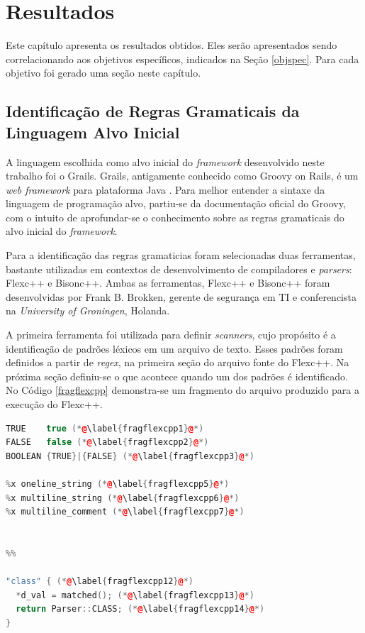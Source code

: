 \chapter[Resultados]{Resultados}
Este capítulo apresenta os resultados obtidos. Eles serão apresentados sendo
correlacionando aos objetivos específicos, indicados na Seção \ref{objspec}.
Para cada objetivo foi gerado uma seção neste capítulo.

\section{Identificação de Regras Gramaticais da Linguagem Alvo Inicial}
A linguagem escolhida como alvo inicial do \textit{framework} desenvolvido
neste trabalho foi o \textsf{Grails}. \textsf{Grails}, antigamente conhecido
como \textsf{Groovy on Rails}, é um \textit{web framework} para plataforma Java
\cite{grails2015}. Para melhor entender a sintaxe da linguagem de programação
alvo, partiu-se da documentação oficial do \textsf{Groovy}, com o intuito de
aprofundar-se o conhecimento sobre as regras gramaticais do alvo inicial do
\textit{framework}.

Para a identificação das regras gramaticias foram selecionadas duas ferramentas,
bastante utilizadas em contextos de desenvolvimento de compiladores e
\textit{parsers}: \textsf{Flexc++} e \textsf{Bisonc++}. Ambas as ferramentas, \textsf{Flexc++} e \textsf{Bisonc++} foram desenvolvidas por Frank B. Brokken, gerente de segurança em TI e conferencista na \textit{University of Groningen}, Holanda.

A primeira ferramenta foi utilizada para definir \textit{scanners}, cujo propósito é a identificação de padrões léxicos em um arquivo de texto. Esses padrões foram definidos a partir de \textit{regex}, na primeira seção do arquivo fonte do Flexc++. Na próxima seção definiu-se o que acontece quando um dos padrões é identificado. No Código \ref{fragflexcpp} demonstra-se um fragmento do arquivo produzido para a execução do \textsf{Flexc++}.

\begin{lstlisting}[language=C++, label=fragflexcpp, caption=Fragmento do código fonte para o \flexcpp]
TRUE    true (*@\label{fragflexcpp1}@*)
FALSE   false (*@\label{fragflexcpp2}@*)
BOOLEAN {TRUE}|{FALSE} (*@\label{fragflexcpp3}@*)

%x oneline_string (*@\label{fragflexcpp5}@*)
%x multiline_string (*@\label{fragflexcpp6}@*)
%x multiline_comment (*@\label{fragflexcpp7}@*)


%%

"class" { (*@\label{fragflexcpp12}@*)
  *d_val = matched(); (*@\label{fragflexcpp13}@*)
  return Parser::CLASS; (*@\label{fragflexcpp14}@*)
}
\end{lstlisting}

